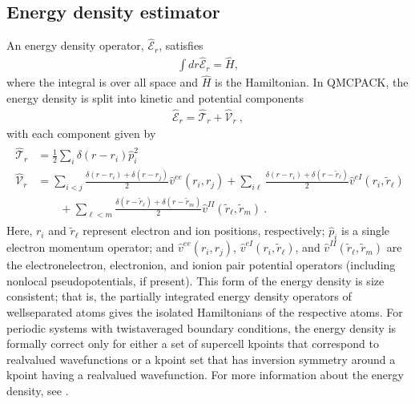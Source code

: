 \documentclass[letterpaper,10pt,english]{sphinxmanual}
\begin{document}
\subsection{Energy density estimator}
\label{\detokenize{hamiltonianobservable:energy-density-estimator}}
An energy density operator, \(\hat{\mathcal{E}}_r\), satisfies
\begin{equation}\label{equation:hamiltonianobservable:eq37}
\begin{split}\int dr \hat{\mathcal{E}}_r = \hat{H},\end{split}
\end{equation}
where the integral is over all space and \(\hat{H}\) is the
Hamiltonian. In QMCPACK, the energy density is split into kinetic and potential
components
\begin{equation}\label{equation:hamiltonianobservable:eq38}
\begin{split}\hat{\mathcal{E}}_r = \hat{\mathcal{T}}_r + \hat{\mathcal{V}}_r\:,\end{split}
\end{equation}
with each component given by
\begin{equation}\label{equation:hamiltonianobservable:eq39}
\begin{split}\begin{aligned}
    \hat{\mathcal{T}}_r &=  \frac{1}{2}\sum_i\delta(r-r_i)\hat{p}_i^2 \\
    \hat{\mathcal{V}}_r &=  \sum_{i<j}\frac{\delta(r-r_i)+\delta(r-r_j)}{2}\hat{v}^{ee}(r_i,r_j)
               + \sum_{i\ell}\frac{\delta(r-r_i)+\delta(r-\tilde{r}_\ell)}{2}\hat{v}^{eI}(r_i,\tilde{r}_\ell) \nonumber\\
     &\qquad   + \sum_{\ell< m}\frac{\delta(r-\tilde{r}_\ell)+\delta(r-\tilde{r}_m)}{2}\hat{v}^{II}(\tilde{r}_\ell,\tilde{r}_m)\:.\nonumber\end{aligned}\end{split}
\end{equation}
Here, \(r_i\) and \(\tilde{r}_\ell\) represent electron and ion
positions, respectively; \(\hat{p}_i\) is a single electron momentum
operator; and \(\hat{v}^{ee}(r_i,r_j)\),
\(\hat{v}^{eI}(r_i,\tilde{r}_\ell)\), and
\(\hat{v}^{II}(\tilde{r}_\ell,\tilde{r}_m)\) are the
electron\sphinxhyphen{}electron, electron\sphinxhyphen{}ion, and ion\sphinxhyphen{}ion pair potential operators
(including nonlocal pseudopotentials, if present). This form of the
energy density is size consistent; that is, the partially integrated
energy density operators of well\sphinxhyphen{}separated atoms gives the isolated
Hamiltonians of the respective atoms. For periodic systems with
twist\sphinxhyphen{}averaged boundary conditions, the energy density is formally
correct only for either a set of supercell k\sphinxhyphen{}points that correspond to
real\sphinxhyphen{}valued wavefunctions or a k\sphinxhyphen{}point set that has inversion symmetry
around a k\sphinxhyphen{}point having a real\sphinxhyphen{}valued wavefunction. For more information
about the energy density, see .
\end{document}
